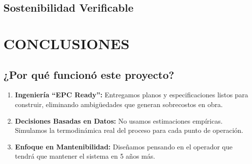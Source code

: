 \documentclass[11pt,letterpaper]{article}
\begin{document}
\vspace{1.5cm}

\subsection{Sostenibilidad Verificable}

\begin{center}
\end{center}

\vspace{1cm}

\section{CONCLUSIONES}

\subsection{¿Por qué funcionó este proyecto?}
\begin{enumerate}
    \item \textbf{Ingeniería ``EPC Ready'':} Entregamos planos y especificaciones listos para construir, eliminando ambigüedades que generan sobrecostos en obra.
    \item \textbf{Decisiones Basadas en Datos:} No usamos estimaciones empíricas. Simulamos la termodinámica real del proceso para cada punto de operación.
    \item \textbf{Enfoque en Mantenibilidad:} Diseñamos pensando en el operador que tendrá que mantener el sistema en 5 años más.
\end{enumerate}
\end{document}
